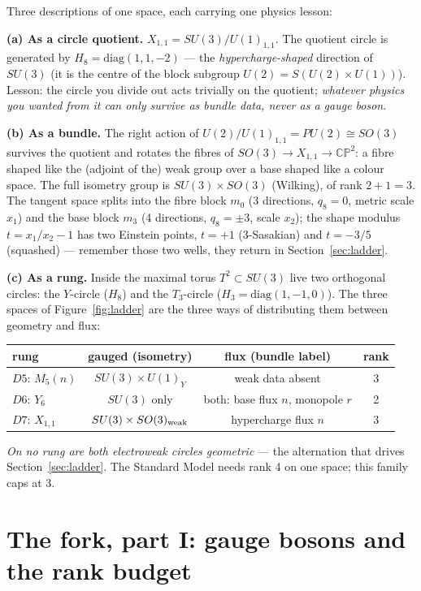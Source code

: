 \documentclass[11pt]{article}
\newcommand{\X}{X_{1,1}}
\newcommand{\CP}{\mathbb{CP}}
\begin{document}
Three descriptions of one space, each carrying one physics lesson:

\textbf{(a) As a circle quotient.} $\X=SU(3)/U(1)_{1,1}$. The quotient circle is generated by
$H_8=\mathrm{diag}(1,1,-2)$ --- the \emph{hypercharge-shaped} direction of $SU(3)$ (it is the
centre of the block subgroup $U(2)=S(U(2)\times U(1))$). Lesson: the circle you divide out
acts trivially on the quotient; \emph{whatever physics you wanted from it can only survive
as bundle data, never as a gauge boson}.

\textbf{(b) As a bundle.} The right action of $U(2)/U(1)_{1,1}=PU(2)\cong SO(3)$ survives the
quotient and rotates the fibres of $SO(3)\to \X\to \CP^2$: a fibre shaped like the
(adjoint of the) weak group over a base shaped like a colour space. The full isometry group
is $SU(3)\times SO(3)$ (Wilking), of rank $2+1=3$. The tangent space splits into the fibre
block $m_0$ (3 directions, $q_8=0$, metric scale $x_1$) and the base block $m_3$
(4 directions, $q_8=\pm3$, scale $x_2$); the shape modulus $t = x_1/x_2-1$ has two Einstein
points, $t=+1$ (3-Sasakian) and $t=-3/5$ (squashed) --- remember those two wells, they return
in Section~\ref{sec:ladder}.

\textbf{(c) As a rung.} Inside the maximal torus $T^2\subset SU(3)$ live two orthogonal
circles: the $Y$-circle ($H_8$) and the $T_3$-circle ($H_3=\mathrm{diag}(1,-1,0)$). The three
spaces of Figure~\ref{fig:ladder} are the three ways of distributing them between geometry
and flux:
\begin{center}
\begin{tabular}{lccc}
\toprule
rung & gauged (isometry) & flux (bundle label) & rank \\
\midrule
$D5$: $M_5(n)$ & $SU(3)\times U(1)_Y$ & weak data absent & 3\\
$D6$: $Y_6$ & $SU(3)$ only & both: base flux $n$, monopole $r$ & 2\\
$D7$: $\X$ & $SU(3)\times SO(3)_{\rm weak}$ & hypercharge flux $n$ & 3\\
\bottomrule
\end{tabular}
\end{center}
\emph{On no rung are both electroweak circles geometric} --- the alternation that drives
Section~\ref{sec:ladder}. The Standard Model needs rank 4 on one space; this family caps at 3.

\section{The fork, part I: gauge bosons and the rank budget}\label{sec:rank}
\end{document}
